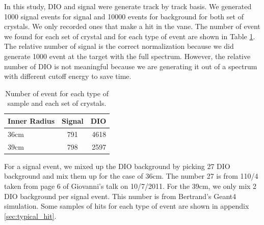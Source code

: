 \documentclass[11pt]{article}
\begin{document}
In this study, DIO and signal were generate track by track basis. We generated 1000 signal events for signal and 10000 events for background for both set of crystals. We only recorded ones that make a hit in the vane. The number of event we found for each set of crystal and for each type of event are shown in Table \ref{tab:numevent}. The relative number of signal is the correct normalization because we did generate 1000 event at the target with the full spectrum. However, the relative number of DIO is not meaningful because we are generating it out of a spectrum with different cutoff energy to save time. 

\begin{table}[htbp]
   \centering
   \begin{tabular}{ lcr } %
		\hline
		Inner Radius & Signal & DIO\\
		\hline
      	36cm & 791 & 4618\\
		39cm & 798 & 2597\\
		\hline
      \end{tabular}
   \caption{Number of event for each type of sample and each set of crystals.}
   \label{tab:numevent}
\end{table}

For a signal event, we mixed up the DIO background by picking 27 DIO background and mix them up for the case of 36cm.  The number 27 is from 110/4 taken from page 6 of Giovanni's talk on 10/7/2011. For the 39cm, we only mix 2 DIO background per signal event. This number is from Bertrand's Geant4 simulation. Some samples of hits for each type of event are shown in appendix \ref{sec:typical_hit}.
\end{document}
